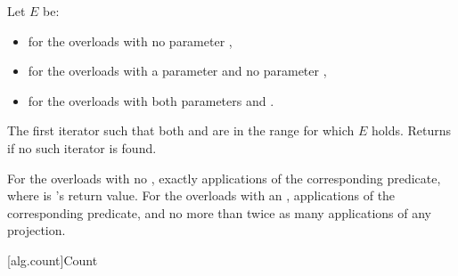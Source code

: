 \begin{itemdescr}
\pnum
Let $E$ be:
\begin{itemize}
\item {} for the overloads with no parameter ,
\item {} for the overloads with a parameter  and no parameter ,
\item {} for the overloads with both parameters  and .
\end{itemize}

\pnum
\returns
The first iterator
such that both
and
are in
the range
for which $E$ holds.
Returns 
if no such iterator is found.

\pnum
\complexity
For the overloads with no , exactly
applications of the corresponding predicate, where  is
's
return value.  For the overloads with an ,
 applications of the corresponding predicate,
and no more than twice as many applications of any projection.
\end{itemdescr}

[alg.count]{Count}


